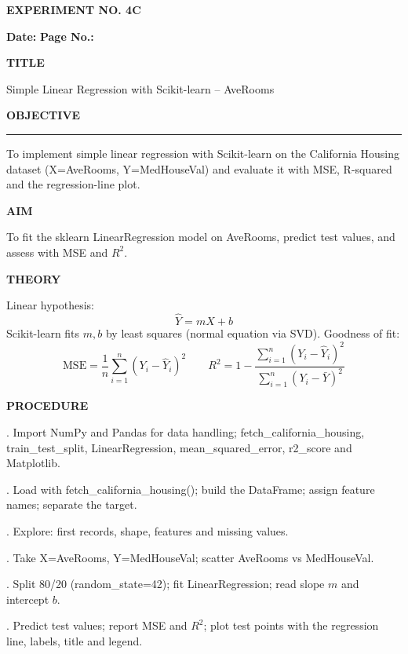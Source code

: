 \documentclass[11pt,twoside]{article}
\newcommand{\expheading}[1]{{\fontsize{14}{17}\selectfont\textbf{#1}\par}}
\newcommand{\fullrule}{\noindent\rule{\textwidth}{0.6pt}\par}
\begin{document}
{\setlength{\parskip}{1pt}\setlength{\abovedisplayskip}{2pt}\setlength{\belowdisplayskip}{2pt}
\begin{center}
\expheading{EXPERIMENT NO. 4C}
\end{center}
\vspace{2pt}

\noindent\textbf{Date:} \underline{\hspace{2.6cm}} \hfill \textbf{Page No.:} \underline{\hspace{2.6cm}}\par
\vspace{6pt}

\expheading{TITLE}
\vspace{4pt}
\noindent Simple Linear Regression with Scikit-learn -- AveRooms\par
\vspace{4pt}

\expheading{OBJECTIVE}
\vspace{2pt}
\fullrule
\vspace{4pt}
\noindent To implement simple linear regression with Scikit-learn on the California Housing dataset (X=AveRooms, Y=MedHouseVal) and evaluate it with MSE, R-squared and the regression-line plot. \par
\vspace{4pt}

\expheading{AIM}
\vspace{4pt}
\noindent To fit the sklearn LinearRegression model on AveRooms, predict test values, and assess with MSE and $R^2$. \par
\vspace{4pt}

\expheading{THEORY}
\vspace{4pt}
Linear hypothesis:
\[\hat{Y}=mX+b\]
Scikit-learn fits $m,b$ by least squares (normal equation via SVD).
Goodness of fit:
\[\mathrm{MSE}=\frac{1}{n}\sum_{i=1}^{n}(Y_i-\hat{Y}_i)^2\qquad R^2=1-\frac{\sum_{i=1}^{n}(Y_i-\hat{Y}_i)^2}{\sum_{i=1}^{n}(Y_i-\bar{Y})^2}\]
\vspace{4pt}

\expheading{PROCEDURE}
\vspace{4pt}
. Import NumPy and Pandas for data handling; fetch\_california\_housing, train\_test\_split, LinearRegression, mean\_squared\_error, r2\_score and Matplotlib.\par
{}. Load with fetch\_california\_housing(); build the DataFrame; assign feature names; separate the target.\par
{}. Explore: first records, shape, features and missing values.\par
{}. Take X=AveRooms, Y=MedHouseVal; scatter AveRooms vs MedHouseVal.\par
{}. Split 80/20 (random\_state=42); fit LinearRegression; read slope $m$ and intercept $b$.\par
{}. Predict test values; report MSE and $R^2$; plot test points with the regression line, labels, title and legend. \par
\vspace{4pt}

}
\end{document}
